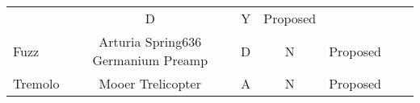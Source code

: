 \begin{table*}[]
{\begin{tabular}{lcccccc}
                & D 
                & Y 
                & Proposed \\
            Fuzz 
                & Arturia Spring636 Germanium Preamp 
                & D 
                & N 
                & Proposed \\
            \midrule
            Tremolo 
                & Mooer Trelicopter 
                & A 
                & N 
                & Proposed \\
            \midrule
            \midrule
        \end{tabular}
    }
    \label{tab:dataset}
\end{table*}